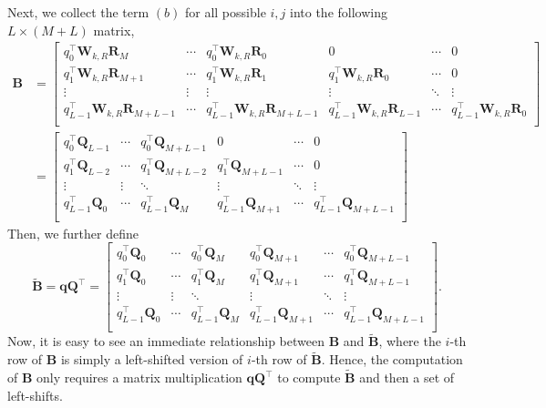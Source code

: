\documentclass[11pt,a4paper]{article}
\def\rvq{{\mathbf{q}}}
\def\rmB{{\mathbf{B}}}
\def\rmQ{{\mathbf{Q}}}
\def\rmR{{\mathbf{R}}}
\def\rmW{{\mathbf{W}}}
\begin{document}
Next, we collect the term $(b)$ for all possible $i, j$ into the following $L \times (M+L)$ matrix,
\begin{align*}
\rmB &=
	\begin{bmatrix}
	q_0^\top \rmW_{k,R} \rmR_{M}   & \cdots & q_0^\top \rmW_{k,R} \rmR_{0} & 0 & \cdots & 0 \\
	q_1^\top \rmW_{k,R} \rmR_{M+1} & \cdots & q_1^\top \rmW_{k,R} \rmR_{1} & q_1^\top \rmW_{k,R} \rmR_{0} & \cdots & 0 \\
	\vdots & \vdots & \vdots & \vdots & \ddots & \vdots \\
	q_{L-1}^\top \rmW_{k,R} \rmR_{M+L-1} & \cdots & q_{L-1}^\top \rmW_{k,R} \rmR_{M+L-1} & q_{L-1}^\top \rmW_{k,R} \rmR_{L-1} & \cdots & q_{L-1}^\top \rmW_{k,R} \rmR_{0} \\
	\end{bmatrix} \\
	&=
	\begin{bmatrix}
	q_0^\top \rmQ_{L-1}   & \cdots & q_0^\top \rmQ_{M+L-1} & 0                       & \cdots & 0 \\
	q_1^\top \rmQ_{L-2}   & \cdots & q_1^\top \rmQ_{M+L-2} & q_1^\top \rmQ_{M+L-1}   & \cdots & 0 \\
	\vdots                & \vdots & \ddots                & \vdots                  & \ddots & \vdots \\
	q_{L-1}^\top \rmQ_{0} & \cdots & q_{L-1}^\top \rmQ_{M} & q_{L-1}^\top \rmQ_{M+1} & \cdots & q_{L-1}^\top \rmQ_{M+L-1} \\
	\end{bmatrix}
\end{align*}
Then, we further define
\[
	\widetilde{\rmB} = \rvq \rmQ^\top =
	\begin{bmatrix}
	q_{0}^\top \rmQ_{0}   & \cdots & q_{0}^\top \rmQ_{M}   & q_{0}^\top \rmQ_{M+1}    & \cdots & q_{0}^\top \rmQ_{M+L-1}   \\
	q_{1}^\top \rmQ_{0}   & \cdots & q_{1}^\top \rmQ_{M}   & q_{1}^\top \rmQ_{M+1}    & \cdots & q_{1}^\top \rmQ_{M+L-1}   \\
	\vdots                & \vdots & \ddots                & \vdots                   & \ddots & \vdots                    \\
	q_{L-1}^\top \rmQ_{0} & \cdots & q_{L-1}^\top \rmQ_{M} & q_{L-1}^\top \rmQ_{M+1}  & \cdots & q_{L-1}^\top \rmQ_{M+L-1} \\
	\end{bmatrix}.
\]
Now, it is easy to see an immediate relationship between $\rmB$ and $\widetilde{\rmB}$, where the $i$-th row of $\rmB$ is simply a left-shifted version of $i$-th row of $\widetilde{\rmB}$.
Hence, the computation of $\rmB$ only requires a matrix multiplication $\rvq \rmQ^\top$ to compute $\widetilde{\rmB}$ and then a set of left-shifts.
\end{document}
